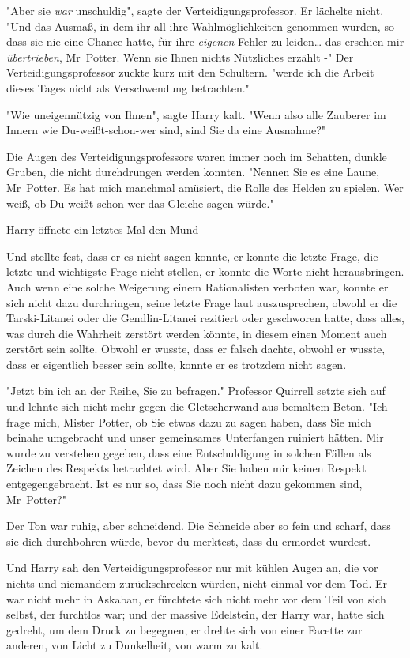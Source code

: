 {"Aber sie \emph{war} unschuldig", sagte der Verteidigungsprofessor. Er lächelte nicht. "Und das Ausmaß, in dem ihr all ihre Wahlmöglichkeiten genommen wurden, so dass sie nie eine Chance hatte, für ihre \emph{eigenen} Fehler zu leiden… das erschien mir \emph{übertrieben}, Mr~Potter. Wenn sie Ihnen nichts Nützliches erzählt -" Der Verteidigungsprofessor zuckte kurz mit den Schultern. "werde ich die Arbeit dieses Tages nicht als Verschwendung betrachten."

"Wie uneigennützig von Ihnen", sagte Harry kalt. "Wenn also alle Zauberer im Innern wie Du-weißt-schon-wer sind, sind Sie da eine Ausnahme?"

Die Augen des Verteidigungsprofessors waren immer noch im Schatten, dunkle Gruben, die nicht durchdrungen werden konnten. "Nennen Sie es eine Laune, Mr~Potter. Es hat mich manchmal amüsiert, die Rolle des Helden zu spielen. Wer weiß, ob Du-weißt-schon-wer das Gleiche sagen würde."

Harry öffnete ein letztes Mal den Mund -

Und stellte fest, dass er es nicht sagen konnte, er konnte die letzte Frage, die letzte und wichtigste Frage nicht stellen, er konnte die Worte nicht herausbringen. Auch wenn eine solche Weigerung einem Rationalisten verboten war, konnte er sich nicht dazu durchringen, seine letzte Frage laut auszusprechen, obwohl er die Tarski-Litanei oder die Gendlin-Litanei rezitiert oder geschworen hatte, dass alles, was durch die Wahrheit zerstört werden könnte, in diesem einen Moment auch zerstört sein sollte. Obwohl er wusste, dass er falsch dachte, obwohl er wusste, dass er eigentlich besser sein sollte, konnte er es trotzdem nicht sagen.

"Jetzt bin ich an der Reihe, Sie zu befragen." Professor Quirrell setzte sich auf und lehnte sich nicht mehr gegen die Gletscherwand aus bemaltem Beton. "Ich frage mich, Mister Potter, ob Sie etwas dazu zu sagen haben, dass Sie mich beinahe umgebracht und unser gemeinsames Unterfangen ruiniert hätten. Mir wurde zu verstehen gegeben, dass eine Entschuldigung in solchen Fällen als Zeichen des Respekts betrachtet wird. Aber Sie haben mir keinen Respekt entgegengebracht. Ist es nur so, dass Sie noch nicht dazu gekommen sind, Mr~Potter?"

Der Ton war ruhig, aber schneidend. Die Schneide aber so fein und scharf, dass sie dich durchbohren würde, bevor du merktest, dass du ermordet wurdest.

Und Harry sah den Verteidigungsprofessor nur mit kühlen Augen an, die vor nichts und niemandem zurückschrecken würden, nicht einmal vor dem Tod. Er war nicht mehr in Askaban, er fürchtete sich nicht mehr vor dem Teil von sich selbst, der furchtlos war; und der massive Edelstein, der Harry war, hatte sich gedreht, um dem Druck zu begegnen, er drehte sich von einer Facette zur anderen, von Licht zu Dunkelheit, von warm zu kalt.

}
